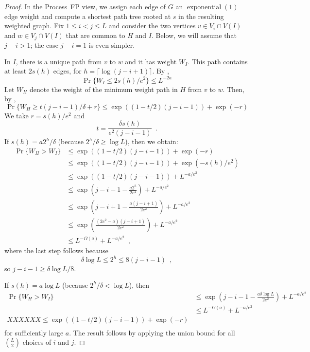\documentclass[lotsofwhite]{patmorin}
\DeclareMathOperator{\exponential}{exponential}
\begin{document}
\begin{proof}
  In the Process~FP view, we assign each edge of $G$ an $\exponential(1)$
  edge weight and compute a shortest path tree rooted at $s$ in the
  resulting weighted graph.  Fix $1\le i< j\le L$ and consider the two
  vertices $v\in V_i\cap V(I)$ and $w\in V_j\cap V(I)$ that are common
  to $H$ and $I$.  Below, we will assume that $j-i>1$; the case $j-i=1$
  is even simpler.

  In $I$, there is a unique path from $v$ to $w$ and it has weight $W_I$.
  This path contains at least $2s(h)$ edges, for $h=\lceil\log (j-i+1)
  \rceil$.  By ,
  \[
     \Pr\{W_I \le 2s(h)/e^2\} \le L^{-2a}
  \]
  Let $W_H$ denote the weight of the minimum weight path in $H$ from
  $v$ to $w$.  Then, by ,
  \[
     \Pr\{W_H \ge t(j-i-1)/\delta+r\} \le \exp((1-t/2)(j-i-1)) + \exp(-r)
  \]
  We take $r=s(h)/e^2$ and
  \[
      t = \frac{\delta s(h)}{e^2(j-i-1)} \enspace . 
  \]
  If $s(h) = a 2^h/\delta$ (because $2^h/\delta\ge\log L$), then we obtain:
  \begin{align*}
     \Pr\{W_H > W_I\} & \le \exp((1-t/2)(j-i-1)) + \exp(-r) \\
         & \le \exp((1-t/2)(j-i-1)) + \exp(-s(h)/e^2) \\
         & \le \exp((1-t/2)(j-i-1)) + L^{-a/e^2} \\
         & \le \exp\left(j-i-1 - \frac{a2^h}{2e^2}\right) + L^{-a/e^2} \\
         & \le \exp\left(j-i+1 - \frac{a(j-i+1)}{2e^2}\right) + L^{-a/e^2} \\
         & \le \exp\left(\frac{(2e^2-a)(j-i+1)}{2e^2}\right) + L^{-a/e^2} \\
         & \le L^{-\Omega(a)} + L^{-a/e^2} \enspace ,
  \end{align*}
  where the last step follows because
  \[
     \delta \log L \le 2^h \le 8(j-i-1) \enspace , 
  \]
  so $j-i-1 \ge \delta\log L/8$.

  If $s(h) = a\log L$ (because $2^h/\delta < \log L$), then 
  \begin{align*}
     \Pr\{W_H > W_I\} 
         & \le \exp\left(j-i-1 - \frac{a\delta\log L}{2e^2}\right) + L^{-a/e^2} \\
         & \le L^{-\Omega(a)} + L^{-a/e^2} \\
XXXXXX
\le \exp((1-t/2)(j-i-1)) + \exp(-r) \\

  \end{align*}
  for sufficiently large $a$.  The result follows by applying the union
  bound for all $\binom{L}{2}$ choices of $i$ and $j$.
 \end{proof}
\end{document}
